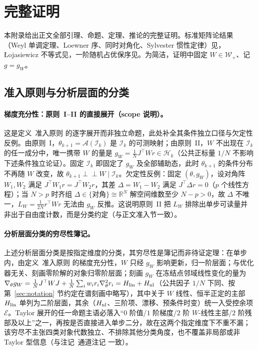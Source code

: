 \documentclass[fontset=windows,11pt]{ctexart}
\newcommand{\R}{\mathbb R}
\newcommand{\W}{W}
\newcommand{\Erem}{\mathcal E}
\numberwithin{equation}{section}
\begin{document}
\section{完整证明}\label{app:proof}
\setcounter{subsection}{-1}
本附录给出正文全部引理、命题、定理、推论的完整证明。标准矩阵论结果（Weyl 单调定理、Loewner 序、同时对角化、Sylvester 惯性定律）见\cite{Bhatia,HornJohnson}，{\L}ojasiewicz 不等式见\cite{AttouchBolte,LiuZhuBelkin2021,ZhouGeJin2021}，一阶随机占优保序见\cite{Strassen1965}。为简洁，证明中固定 $\W\in\mathcal W_+$、记 $g=g_{\W}$。

\subsection{准入原则与分析层面的分类}
\paragraph{梯度充分性：原则~I--II 的直接展开（scope 说明）。}
这是定义~准入原则 的逐字展开而非独立命题，此处补全其条件独立口径与欠定性反例。由原则~I，$\theta_{k+1}=\mathcal A(\mathcal I_k)$ 是 $\mathcal I_k$ 的可测映射；由原则~II，$\W$ 不出现在 $\mathcal I_k$ 的任一成分中，唯一携带 $\W$ 的量是 $g_{\W}=\tfrac1N J^\top\W r\in\mathcal H_k$（公共正标量 $1/N$ 不影响下述条件独立论证）。固定 $\mathcal I_k$ 即固定了 $g_{\W}$ 及全部辅助态，此时 $\theta_{k+1}$ 的条件分布不再随 $\W$ 改变，故 $\theta_{k+1}\perp\!\!\!\perp\W\mid\mathcal I_k$。欠定性反例：固定 $(\theta,g_{\W})$，设对角阵 $\W_1,\W_2$ 满足 $J^\top\W_1r=J^\top\W_2r$，其差 $\Delta=\W_1-\W_2$ 满足 $J^\top\Delta r=0$（$p$ 个线性方程）；当 $N>p$ 时齐组 $\Delta\in\{\text{对角}\}\cong\R^N$ 解空间维数至少 $N-p>0$，故 $\Delta$ 不唯一，$L_{\W}=\tfrac1{2N}r^\top\W r$ 无法由 $g_{\W}$ 反推。这说明原则~II 把 $L_{\W}$ 排除出单步可读量并非出于自由度计数，而是分类约定（与正文准入节一致）。

\paragraph{分析层面分类的穷尽性簿记。}
上述分析层面分类是按指定维度的分类，其穷尽性是簿记而非待证定理：在单步内，由定义~准入原则 的梯度充分性，$\W$ 只经 $g_{\W}$ 影响更新，归一阶层面；与优化器无关、刻画零阶解的对象归零阶层面；刻画 $g_{\W}$ 在冻结点邻域线性变化的量为 $\nabla_\theta g_{\W}=\tfrac1N J^\top\W J+\tfrac1N\sum_iw_ir_i\nabla_\theta^2r_i=H_{\rm lin}+H_{\rm nl}$（公共因子 $1/N$ 下同、按第~\ref{sec:notation} 节约定在谱刻画中略写），其中关于 $\W$ 线性、恒半正定的主部 $H_{\rm lin}$ 单列为二阶层面，其余（$H_{\rm nl}$、三阶项、漂移、预条件时变）统一入受控余项 $\Erem$。Taylor 展开的任一命题主语必落入“$0$ 阶值/$1$ 阶梯度/$2$ 阶 $\W$-线性主部/$2$ 阶残部及以上”之一，再按是否直接进入单步二分，故在这两个指定维度下不重不漏；该穷尽不主张四类对象代数独立、不排除其他分类角度，也不覆盖非局部或非 Taylor 型信息（与注记~通道注记 一致）。
\end{document}
